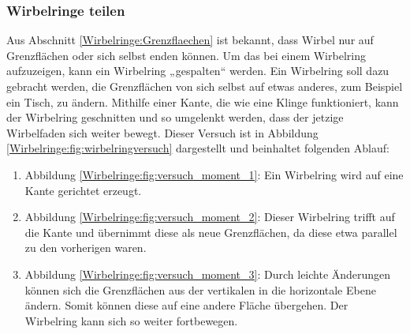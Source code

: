 \subsubsection{Wirbelringe teilen}

Aus Abschnitt \ref{Wirbelringe:Grenzflaechen} ist bekannt, dass Wirbel nur auf Grenzflächen oder sich selbst enden können. 
Um das bei einem Wirbelring aufzuzeigen, kann ein Wirbelring „gespalten“ werden. 
Ein Wirbelring soll dazu gebracht werden, die Grenzflächen von sich selbst auf etwas anderes, zum Beispiel ein Tisch, zu ändern. 
Mithilfe einer Kante, die wie eine Klinge funktioniert, kann der Wirbelring geschnitten und so umgelenkt werden, dass der jetzige Wirbelfaden sich weiter bewegt. 
Dieser Versuch ist in Abbildung \ref{Wirbelringe:fig:wirbelringversuch} dargestellt und beinhaltet folgenden Ablauf:



\begin{enumerate}
    \item Abbildung \ref{Wirbelringe:fig:versuch_moment_1}: Ein Wirbelring wird auf eine Kante gerichtet erzeugt.
    \item Abbildung \ref{Wirbelringe:fig:versuch_moment_2}: Dieser Wirbelring trifft auf die Kante und übernimmt diese als neue Grenzflächen, da diese etwa parallel zu den vorherigen waren.
    \item Abbildung \ref{Wirbelringe:fig:versuch_moment_3}: Durch leichte Änderungen können sich die Grenzflächen aus der vertikalen in die horizontale Ebene ändern.
    Somit können diese auf eine andere Fläche übergehen.
    Der Wirbelring kann sich so weiter fortbewegen.
\end{enumerate}
    

